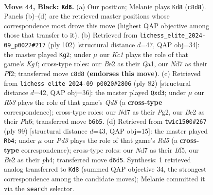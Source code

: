 \documentclass[11pt]{article}
\begin{document}
\clearpage

\begin{figure}[p]\centering
\begin{subfigure}{0.46\textwidth}\centering
\resizebox{\linewidth}{!}{%
\newchessgame
\chessboard[
  setfen={2k5/1p1n4/1r1p4/R7/1P2PQ2/8/4b1PP/K7 b - - 1 44},
  showmover=false,
  pgfstyle=straightmove, color=movearrow, markmove={c8-d8}
]}
\caption{}
\end{subfigure}\hfill
\begin{subfigure}{0.46\textwidth}\centering
\resizebox{\linewidth}{!}{%
\newchessgame
\chessboard[
  setfen={3r2k1/4qp2/6p1/8/5R1P/4P3/5P2/Q5K1 w - - 1 52},
  showmover=false,
  pgfstyle=straightmove, color=movearrow, markmove={g1-g2}
]}
\caption{}
\end{subfigure}
\\[4pt]
\begin{subfigure}{0.46\textwidth}\centering
\resizebox{\linewidth}{!}{%
\newchessgame
\chessboard[
  setfen={3Q4/pp5p/6pP/2k5/8/3p1R2/2q2PP1/6K1 w - - 2 42},
  showmover=false,
  pgfstyle=straightmove, color=movearrow, markmove={d8-d3}
]}
\caption{}
\end{subfigure}\hfill
\begin{subfigure}{0.46\textwidth}\centering
\resizebox{\linewidth}{!}{%
\newchessgame
\chessboard[
  setfen={8/5pk1/5p2/1P3b1p/3r3P/6P1/3r1P2/Q1R3K1 b - - 14 50},
  showmover=false,
  pgfstyle=straightmove, color=movearrow, markmove={d4-b4}
]}
\caption{}
\end{subfigure}
\caption{\textbf{Move 44, Black: \texttt{Kd8}.} (a) Our position; Melanie plays \texttt{Kd8} (\texttt{c8d8}). Panels (b)--(d) are the retrieved master positions whose correspondence most drove this move (highest QAP objective among those that transfer to it). (b) Retrieved from \texttt{lichess\_elite\_2024-09\_p0022\#217} (ply 102) [structural distance $d$=47, QAP obj=34]: the master played \texttt{Kg2}; under $\mu$ our \emph{Kc1} plays the role of that game's \emph{Kg1}; cross-type roles: our \emph{B}e2 as their \emph{Q}a1, our \emph{N}d7 as their \emph{P}f2; transferred move \texttt{c8d8} \textbf{(endorses this move)}. (c) Retrieved from \texttt{lichess\_elite\_2024-09\_p0020\#2806} (ply 82) [structural distance $d$=42, QAP obj=36]: the master played \texttt{Qxd3}; under $\mu$ our \emph{Rb3} plays the role of that game's \emph{Qd8} (a \textbf{cross-type} correspondence); cross-type roles: our \emph{N}d7 as their \emph{P}g2, our \emph{B}e2 as their \emph{P}h6; transferred move \texttt{b6b5}. (d) Retrieved from \texttt{twic1500\#267} (ply 99) [structural distance $d$=43, QAP obj=15]: the master played \texttt{Rb4}; under $\mu$ our \emph{Pd3} plays the role of that game's \emph{Rd5} (a \textbf{cross-type} correspondence); cross-type roles: our \emph{N}d7 as their \emph{B}f5, our \emph{B}e2 as their \emph{p}h4; transferred move \texttt{d6d5}. Synthesis: 1 retrieved analog transferred to \texttt{Kd8} (summed QAP objective 34, the strongest correspondence among the candidate moves); Melanie committed it via the \texttt{search} selector.}
\label{fig:thought-m87}
\end{figure}
\end{document}
